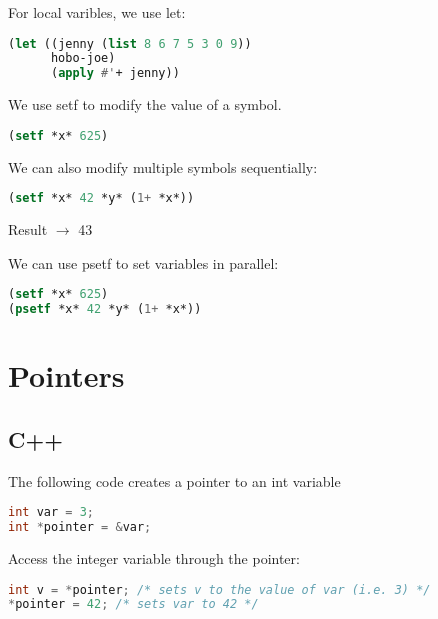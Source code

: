 \documentclass[12pt]{book}
\begin{document}
For local varibles, we use let:


\lstset{style=mystyle}
\begin{lstlisting}[language=Lisp, caption=Lisp example]
(let ((jenny (list 8 6 7 5 3 0 9))
      hobo-joe)
      (apply #'+ jenny))
\end{lstlisting}



\newpage

We use setf to modify the value of a symbol.


\lstset{style=mystyle}
\begin{lstlisting}[language=Lisp, caption=Lisp example]
(setf *x* 625)
\end{lstlisting}


We can also modify multiple symbols sequentially:


\lstset{style=mystyle}
\begin{lstlisting}[language=Lisp, caption=Lisp example]
(setf *x* 42 *y* (1+ *x*))
\end{lstlisting}

Result $\to$  43


We can use psetf to set variables in parallel:

\lstset{style=mystyle}
\begin{lstlisting}[language=Lisp, caption=Lisp example]
(setf *x* 625)
(psetf *x* 42 *y* (1+ *x*))
\end{lstlisting}



\newpage

\section{Pointers}


\subsection{C++}

The following code creates a pointer to an int variable

\lstset{style=mystyle}
\begin{lstlisting}[language=C++, caption=C++ example]
int var = 3;
int *pointer = &var;
\end{lstlisting}

Access the integer variable through the pointer:


\lstset{style=mystyle}
\begin{lstlisting}[language=C++, caption=C++ example]
int v = *pointer; /* sets v to the value of var (i.e. 3) */
*pointer = 42; /* sets var to 42 */
\end{lstlisting}
\end{document}
